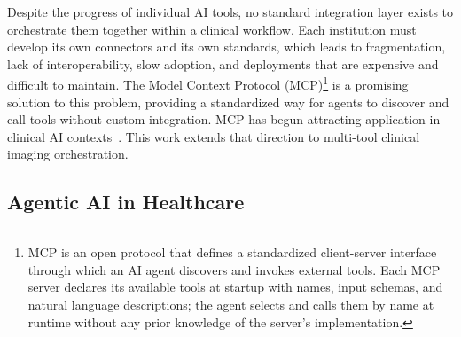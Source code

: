 \documentclass[conference]{IEEEtran}
\begin{document}
Despite the progress of individual AI tools, no standard integration layer exists to orchestrate them together within a clinical workflow. Each institution must develop its own connectors and its own standards, which leads to fragmentation, lack of interoperability, slow adoption, and deployments that are expensive and difficult to maintain. The Model Context Protocol (MCP)\footnote{MCP is an open protocol that defines a standardized client-server interface through which an AI agent discovers and invokes external tools. Each MCP server declares its available tools at startup with names, input schemas, and natural language descriptions; the agent selects and calls them by name at runtime without any prior knowledge of the server's implementation.} is a promising solution to this problem, providing a standardized way for agents to discover and call tools without custom integration. MCP has begun attracting application in clinical AI contexts~\cite{transformingclinical2026, kalathas2026mcp, ehtesham2025mcpfhir}. This work extends that direction to multi-tool clinical imaging orchestration.

\subsection{Agentic AI in Healthcare}

\end{document}
